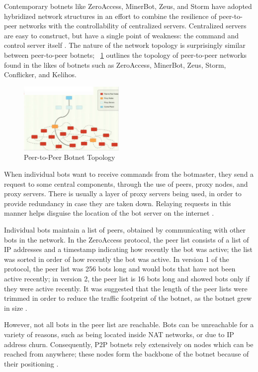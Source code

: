 \documentclass{acm_proc_article-sp}
\begin{document}
Contemporary botnets like ZeroAccess, MinerBot, Zeus, and Storm have adopted hybridized network structures in an effort to combine the resilience of peer-to-peer networks with the controllability of centralized servers.  Centralized servers are easy to construct, but have a single point of weakness: the command and control server itself \cite{wang:p2p}.  The nature of the network topology is surprisingly similar between peer-to-peer botnets;  ~\ref{fig:p2p-architecture} outlines the topology of peer-to-peer networks found in the likes of botnets such as ZeroAccess, MinerBot, Zeus, Storm, Conflicker, and Kelihos.

\begin{figure}[h]\centering
\includegraphics[width=0.45\textwidth]{p2p-architecture.png}
\caption{Peer-to-Peer Botnet Topology}
\label{fig:p2p-architecture}
\end{figure}


When individual bots want to receive commands from the botmaster, they send a request to some central components, through the use of peers, proxy nodes, and proxy servers. There is usually a layer of proxy servers being used, in order to provide redundancy in case they are taken down. Relaying requests in this manner helps disguise the location of the bot server on the internet \cite{defcon:prowling}.

Individual bots maintain a list of peers, obtained by communicating with other bots in the network.  In the ZeroAccess protocol, the peer list consists of a list of IP addresses and a timestamp indicating how recently the bot was active; the list was sorted in order of how recently the bot was active. In version 1 of the protocol, the peer list was 256 bots long and would bots that have not been active recently; in version 2, the peer list is 16 bots long and showed bots only if they were active recently.  It was suggested that the length of the peer lists were trimmed in order to reduce the traffic footprint of the botnet, as the botnet grew in size  \cite{defcon:prowling}.  

However, not all bots in the peer list are reachable.  Bots can be unreachable for a variety of reasons, such as being located inside NAT networks, or due to IP address churn.   Consequently, P2P botnets rely extensively on nodes which can be reached from anywhere; these nodes form the backbone of the botnet because of their positioning \cite{defcon:prowling}.
\end{document}
